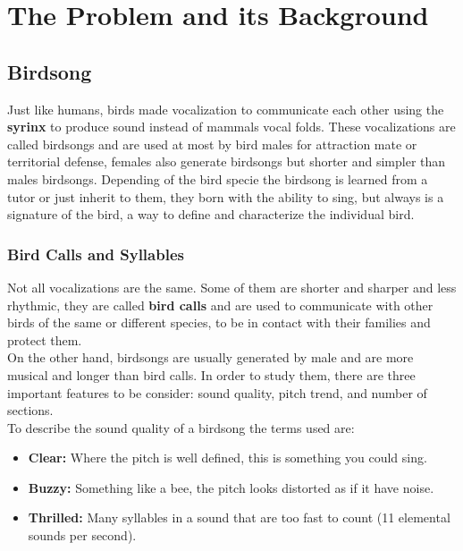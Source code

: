 \chapter{The Problem and its Background}\label{chap_problem_background}

\section{Birdsong}

Just like humans, birds made vocalization to communicate each other using the \textbf{syrinx} to produce sound instead of mammals vocal folds. These vocalizations are called birdsongs and are used at most by bird males for attraction mate or territorial defense, females also generate birdsongs but shorter and simpler than males birdsongs. Depending of the bird specie the birdsong is learned from a tutor or just inherit to them, they born with the ability to sing, but always is a signature of the bird, a way to define and characterize the individual bird. 



\subsection{Bird Calls and Syllables}

Not all vocalizations are the same. Some of them are shorter and sharper and less rhythmic, they are called \textbf{bird calls} and are used to communicate with other birds of the same or different species, to be in contact with their families and protect them. \\

On the other hand, birdsongs are usually generated by male and are more musical and longer than bird calls. In order to study them, there are three important features to be consider: sound quality, pitch trend, and number of sections.\\

To describe the sound quality of a birdsong the terms used are:

\begin{itemize}
    \item \textbf{Clear:} Where the pitch is well defined, this is something you could sing.
    \item \textbf{Buzzy:} Something like a bee, the pitch looks distorted as if it have noise.
    \item \textbf{Thrilled:} Many syllables in a sound that are too fast to count (11 elemental sounds per second).
\end{itemize}

